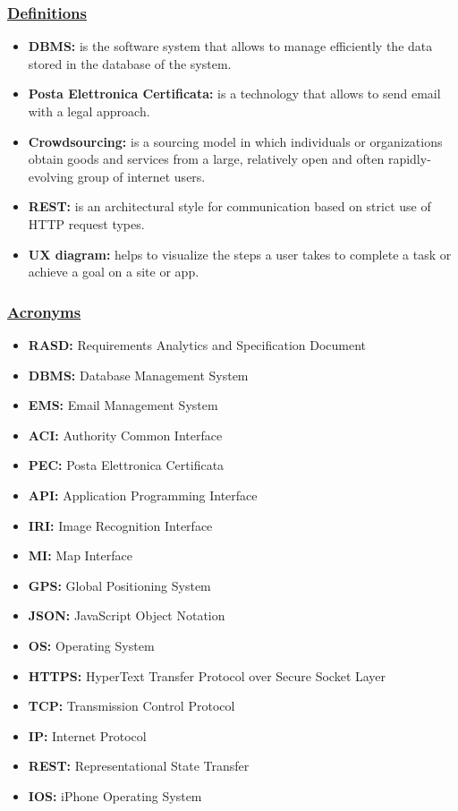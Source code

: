 		\subsubsection[Definitions]{\hyperlink{toc}{Definitions}}
			\begin{itemize}
				\item \textbf{DBMS:} is the software system that allows to manage efficiently the data stored in the database of the system.
				
				\item \textbf{Posta Elettronica Certificata:} is a technology that allows to send email with a legal approach.
				
				\item \textbf{Crowdsourcing:} is a sourcing model in which individuals or organizations obtain goods and services from a large, relatively open and often rapidly-evolving group of internet users.
				
				\item \textbf{REST:} is an architectural style for communication based on strict use of HTTP request types.
				
				\item \textbf{UX diagram:} helps to visualize the steps a user takes to complete a task or achieve a goal on a site or app.
			\end{itemize}
		
		\subsubsection[Acronyms]{\hyperlink{toc}{Acronyms}}
			\begin{itemize}
				\item \textbf{RASD:} Requirements Analytics and Specification Document
				\item \textbf{DBMS:} Database Management System
				\item \textbf{EMS:} Email Management System
				\item \textbf{ACI:} Authority Common Interface
				\item \textbf{PEC:} Posta Elettronica Certificata
				\item \textbf{API:} Application Programming Interface
				\item \textbf{IRI:} Image Recognition Interface
				\item \textbf{MI:} Map Interface
				\item \textbf{GPS:} Global Positioning System
				\item \textbf{JSON:} JavaScript Object Notation
				\item \textbf{OS:} Operating System
				\item \textbf{HTTPS:} HyperText Transfer Protocol over Secure Socket Layer
				\item \textbf{TCP:} Transmission Control Protocol
				\item \textbf{IP:} Internet Protocol
				\item \textbf{REST:} Representational State Transfer
				\item \textbf{IOS:} iPhone Operating System	
			\end{itemize}
			
